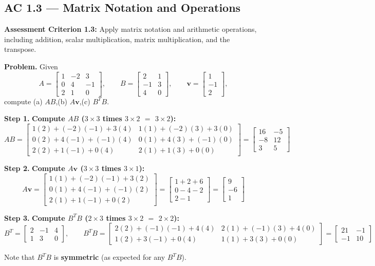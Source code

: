 \documentclass[12pt,a4paper]{article}
\newcommand{\step}[1]{\noindent\textbf{Step #1.}\;}
\newcommand{\mat}[1]{\begin{bmatrix}#1\end{bmatrix}}
\begin{document}
	\newpage
	
	\subsection{AC 1.3 — Matrix Notation and Operations}
	
	\begin{tcolorbox}[subtopic]
		\textbf{Assessment Criterion 1.3:} Apply matrix notation and arithmetic operations,
		including addition, scalar multiplication, matrix multiplication, and the transpose.
	\end{tcolorbox}
	
	\begin{tcolorbox}[worked]
		\textbf{Problem.} Given
		\[
		A = \mat{1 & -2 & 3 \\ 0 & 4 & -1 \\ 2 & 1 & 0},\qquad
		B = \mat{2 & 1 \\ -1 & 3 \\ 4 & 0},\qquad
		\mathbf{v} = \mat{1 \\ -1 \\ 2},
		\]
		compute (a) $AB$,\quad (b) $A\mathbf{v}$,\quad (c) $B^T B$.
		
		\step{1} \textbf{Compute $AB$ ($3\times3$ times $3\times2$ $=$ $3\times2$):}
		\[
		AB = \mat{1(2)+(-2)(-1)+3(4) & 1(1)+(-2)(3)+3(0) \\
			0(2)+4(-1)+(-1)(4)  & 0(1)+4(3)+(-1)(0) \\
			2(2)+1(-1)+0(4)     & 2(1)+1(3)+0(0)}
		= \mat{16 & -5 \\ -8 & 12 \\ 3 & 5}
		\]
		
		\step{2} \textbf{Compute $A\mathbf{v}$ ($3\times3$ times $3\times1$):}
		\[
		A\mathbf{v} = \mat{1(1)+(-2)(-1)+3(2) \\ 0(1)+4(-1)+(-1)(2) \\ 2(1)+1(-1)+0(2)}
		= \mat{1+2+6 \\ 0-4-2 \\ 2-1} = \mat{9 \\ -6 \\ 1}
		\]
		
		\step{3} \textbf{Compute $B^T B$ ($2\times3$ times $3\times2$ $=$ $2\times2$):}
		\[
		B^T = \mat{2 & -1 & 4 \\ 1 & 3 & 0}, \qquad
		B^T B = \mat{2(2)+(-1)(-1)+4(4) & 2(1)+(-1)(3)+4(0) \\
			1(2)+3(-1)+0(4)     & 1(1)+3(3)+0(0)}
		= \mat{21 & -1 \\ -1 & 10}
		\]
		
		Note that $B^T B$ is \textbf{symmetric} (as expected for any $B^T B$).
	\end{tcolorbox}
	
\end{document}
